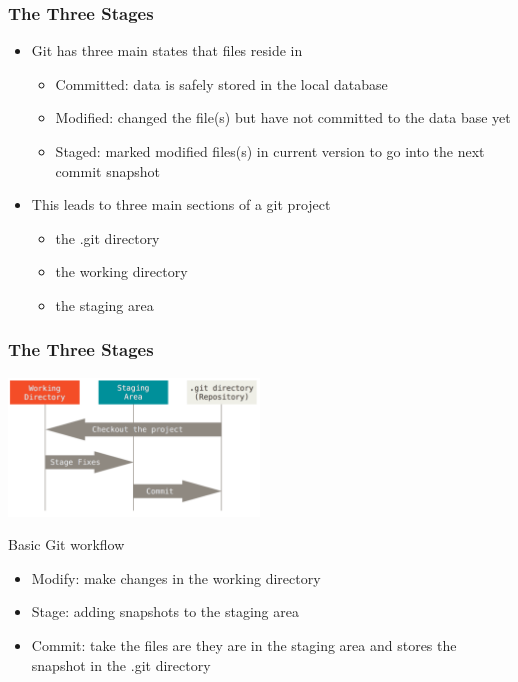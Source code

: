 \begin{frame}
  \frametitle{The Three Stages}
  \begin{itemize}
    \item Git has three main states that files reside in
      \begin{itemize}
        \item Committed: data is safely stored in the local database
        \item Modified: changed the file(s) but have not committed to the
          data base yet
        \item Staged: marked modified files(s) in current version to go into the
          next commit snapshot
      \end{itemize}
    \item This leads to three main sections of a git project
      \begin{itemize}
        \item the .git directory
        \item the working directory
        \item the staging area
      \end{itemize}
  \end{itemize}
\end{frame}

\begin{frame}
  \frametitle{The Three Stages}
  \begin{center}
  \includegraphics[width=0.5\textwidth]{areas}
  \end{center}

  Basic Git workflow
  \begin{itemize}
    \item Modify: make changes in the working directory
    \item Stage: adding snapshots to the staging area
    \item Commit: take the files are they are in the staging area and stores the
      snapshot in the .git directory
  \end{itemize}
\end{frame}
